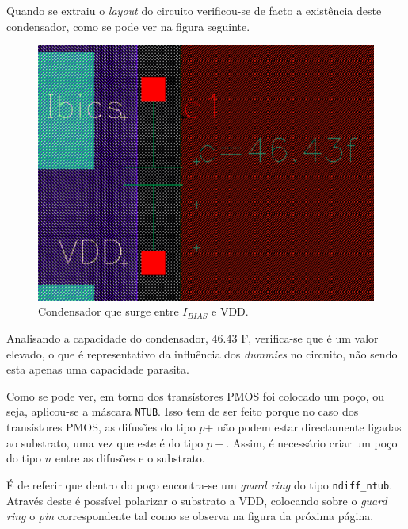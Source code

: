 \documentclass[11pt]{article}
\numberwithin{equation}{section}
\begin{document}
Quando se extraiu o \textit{layout} do circuito verificou-se de facto a existência deste condensador, como se pode ver na figura seguinte. 

\begin{figure}[H]
	\centering
	\includegraphics[keepaspectratio=true, scale=0.35]{exps/condensador1}
	\vspace{-0.5em}
	\caption{Condensador que surge entre $I_{BIAS}$ e VDD.}
	\vspace{-0.8em}
\end{figure}

Analisando a capacidade do condensador, 46.43 F, verifica-se que é um valor elevado, o que é representativo da influência dos \textit{dummies} no circuito, não sendo esta apenas uma capacidade parasita.

Como se pode ver, em torno dos transístores PMOS foi colocado um poço, ou seja, aplicou-se a máscara \texttt{NTUB}. Isso tem de ser feito porque no caso dos transístores PMOS, as difusões do tipo $p$+ não podem estar directamente ligadas ao substrato, uma vez que este é do tipo $p+$. Assim, é necessário criar um poço do tipo $n$ entre as difusões e o substrato.

É de referir que dentro do poço encontra-se um \textit{guard ring} do tipo \texttt{ndiff\_ntub}. Através deste é possível polarizar o substrato a VDD, colocando sobre o \textit{guard ring} o \textit{pin} correspondente tal como se observa na figura da próxima página.
\end{document}
